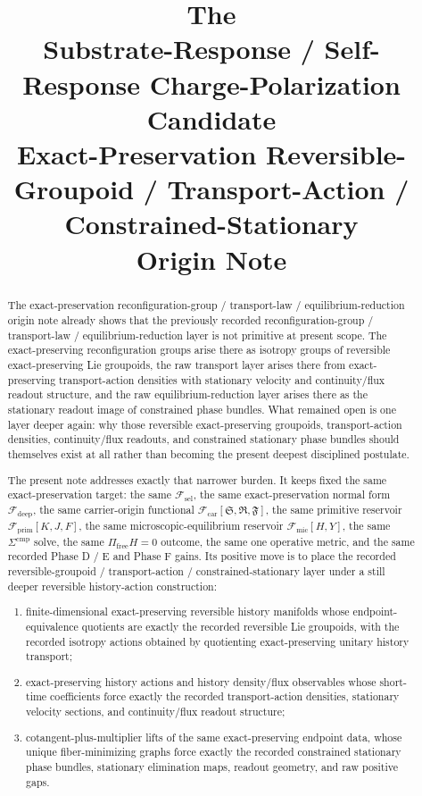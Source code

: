 \documentclass[11pt]{article}
\title{\textbf{The \TheoryName{}}\\[0.4em]
\large Substrate-Response / Self-Response Charge-Polarization Candidate\\
\large Exact-Preservation Reversible-Groupoid / Transport-Action / Constrained-Stationary\\
\large Origin Note}
\author{}
\date{}
\newcommand{\GaugeAux}{Y}
\newcommand{\MicFunctional}{\mathscr F_{\mathrm{mic}}}
\newcommand{\PrimFunctional}{\mathscr F_{\mathrm{prim}}}
\newcommand{\CarrierFunctional}{\mathscr F_{\mathrm{car}}}
\newcommand{\DeepFunctional}{\mathscr F_{\mathrm{deep}}}
\newcommand{\StemFunctional}{\mathscr F_{\mathrm{sel}}}
\newcommand{\PrimStrain}{K}
\newcommand{\PrimNeutral}{J}
\newcommand{\PrimFree}{F}
\newcommand{\CarrierSeed}{\mathfrak S}
\newcommand{\RelabelSeed}{\mathfrak R}
\newcommand{\FreeSeed}{\mathfrak F}
\begin{document}
\maketitle

\begin{abstract}
The exact-preservation reconfiguration-group / transport-law / equilibrium-reduction origin note already shows that the previously recorded reconfiguration-group / transport-law / equilibrium-reduction layer is not primitive at present scope. The exact-preserving reconfiguration groups arise there as isotropy groups of reversible exact-preserving Lie groupoids, the raw transport layer arises there from exact-preserving transport-action densities with stationary velocity and continuity/flux readout structure, and the raw equilibrium-reduction layer arises there as the stationary readout image of constrained phase bundles. What remained open is one layer deeper again: why those reversible exact-preserving groupoids, transport-action densities, continuity/flux readouts, and constrained stationary phase bundles should themselves exist at all rather than becoming the present deepest disciplined postulate.

The present note addresses exactly that narrower burden. It keeps fixed the same exact-preservation target: the same \(\StemFunctional\), the same exact-preservation normal form \(\DeepFunctional\), the same carrier-origin functional \(\CarrierFunctional[\CarrierSeed,\RelabelSeed,\FreeSeed]\), the same primitive reservoir \(\PrimFunctional[\PrimStrain,\PrimNeutral,\PrimFree]\), the same microscopic-equilibrium reservoir \(\MicFunctional[H,\GaugeAux]\), the same \(\Sigma^{\mathrm{cmp}}\) solve, the same \(\Pi_{\mathrm{free}}H=0\) outcome, the same one operative metric, and the same recorded Phase D / E and Phase F gains. Its positive move is to place the recorded reversible-groupoid / transport-action / constrained-stationary layer under a still deeper reversible history-action construction:
\begin{enumerate}
    \item finite-dimensional exact-preserving reversible history manifolds whose endpoint-equivalence quotients are exactly the recorded reversible Lie groupoids, with the recorded isotropy actions obtained by quotienting exact-preserving unitary history transport;
    \item exact-preserving history actions and history density/flux observables whose short-time coefficients force exactly the recorded transport-action densities, stationary velocity sections, and continuity/flux readout structure;
    \item cotangent-plus-multiplier lifts of the same exact-preserving endpoint data, whose unique fiber-minimizing graphs force exactly the recorded constrained stationary phase bundles, stationary elimination maps, readout geometry, and raw positive gaps.
\end{enumerate}


\end{abstract}
\end{document}
